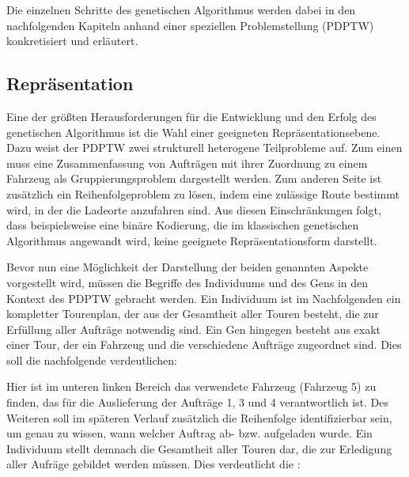 Die einzelnen Schritte des genetischen Algorithmus werden dabei in den nachfolgenden Kapiteln anhand einer speziellen Problemstellung (PDPTW) konkretisiert und erläutert.

\subsection{Repräsentation}
Eine der größten Herausforderungen für die Entwicklung und den Erfolg des genetischen Algorithmus ist die Wahl einer geeigneten Repräsentationsebene. Dazu weist der PDPTW zwei strukturell heterogene Teilprobleme auf. Zum einen muss eine Zusammenfassung von Aufträgen mit ihrer Zuordnung zu einem Fahrzeug als Gruppierungsproblem dargestellt werden. Zum anderen Seite ist zusätzlich ein Reihenfolgeproblem zu lösen, indem eine zulässige Route bestimmt wird, in der die Ladeorte anzufahren sind. Aus diesen Einschränkungen folgt, dass beispielsweise eine binäre Kodierung, die im klassischen genetischen Algorithmus angewandt wird, keine geeignete Repräsentationsform darstellt. 

Bevor nun eine Möglichkeit der Darstellung der beiden genannten Aspekte vorgestellt wird, müssen die Begriffe des Individuums und des Gens in den Kontext des PDPTW gebracht werden. Ein Individuum ist im Nachfolgenden ein kompletter Tourenplan, der aus der Gesamtheit aller Touren besteht, die zur Erfüllung aller Aufträge notwendig sind. Ein Gen hingegen besteht aus exakt einer Tour, der ein Fahrzeug und die verschiedene Aufträge zugeordnet sind. Dies soll die nachfolgende  verdeutlichen:


Hier ist im unteren linken Bereich das verwendete Fahrzeug (Fahrzeug 5) zu finden, das für die Auslieferung der Aufträge 1, 3 und 4 verantwortlich ist. Des Weiteren soll im späteren Verlauf zusätzlich die Reihenfolge identifizierbar sein, um genau zu wissen, wann welcher Auftrag ab- bzw. aufgeladen wurde. Ein Individuum stellt demnach die Gesamtheit aller Touren dar, die zur Erledigung aller Aufräge gebildet werden müssen. Dies verdeutlicht die :

